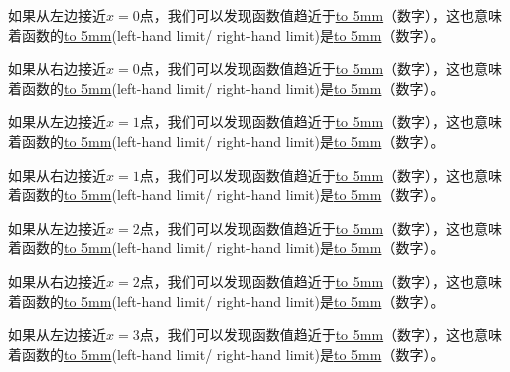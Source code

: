 \documentclass[UTF8]{ctexart}
\begin{document}
\begin{center}
\end{center}

如果从左边接近$x = 0$点，我们可以发现函数值趋近于\underline{\hbox to 5mm{}}（数字），这也意味着函数的\underline{\hbox to 5mm{}}(left-hand limit/ right-hand limit)是\underline{\hbox to 5mm{}}（数字）。

如果从右边接近$x = 0$点，我们可以发现函数值趋近于\underline{\hbox to 5mm{}}（数字），这也意味着函数的\underline{\hbox to 5mm{}}(left-hand limit/ right-hand limit)是\underline{\hbox to 5mm{}}（数字）。

如果从左边接近$x = 1$点，我们可以发现函数值趋近于\underline{\hbox to 5mm{}}（数字），这也意味着函数的\underline{\hbox to 5mm{}}(left-hand limit/ right-hand limit)是\underline{\hbox to 5mm{}}（数字）。

如果从右边接近$x = 1$点，我们可以发现函数值趋近于\underline{\hbox to 5mm{}}（数字），这也意味着函数的\underline{\hbox to 5mm{}}(left-hand limit/ right-hand limit)是\underline{\hbox to 5mm{}}（数字）。

如果从左边接近$x = 2$点，我们可以发现函数值趋近于\underline{\hbox to 5mm{}}（数字），这也意味着函数的\underline{\hbox to 5mm{}}(left-hand limit/ right-hand limit)是\underline{\hbox to 5mm{}}（数字）。

如果从右边接近$x = 2$点，我们可以发现函数值趋近于\underline{\hbox to 5mm{}}（数字），这也意味着函数的\underline{\hbox to 5mm{}}(left-hand limit/ right-hand limit)是\underline{\hbox to 5mm{}}（数字）。

如果从左边接近$x = 3$点，我们可以发现函数值趋近于\underline{\hbox to 5mm{}}（数字），这也意味着函数的\underline{\hbox to 5mm{}}(left-hand limit/ right-hand limit)是\underline{\hbox to 5mm{}}（数字）。
\end{document}
